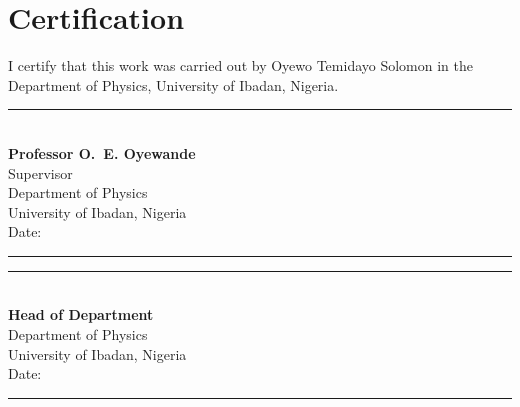 \chapter*{Certification}

I certify that this work was carried out by Oyewo Temidayo Solomon in the
Department of Physics, University of Ibadan, Nigeria.

\vspace{3cm}

\noindent\rule{7cm}{0.4pt}\\
\textbf{Professor O.~E. Oyewande}\\
Supervisor\\
Department of Physics\\
University of Ibadan, Nigeria\\
Date: \rule{4cm}{0.4pt}

\vspace{2.5cm}

\noindent\rule{7cm}{0.4pt}\\
\textbf{Head of Department}\\
Department of Physics\\
University of Ibadan, Nigeria\\
Date: \rule{4cm}{0.4pt}
